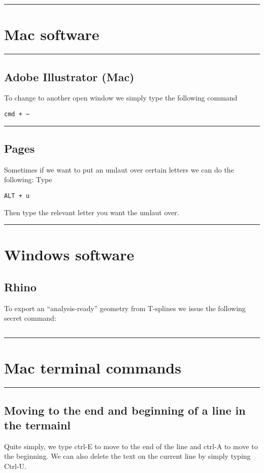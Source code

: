 \documentclass[a4paper, 10pt]{article}
\newcommand{\mytoprule}{\hrule\vspace{4mm}}
\newcommand{\mybotrule}{\vspace{4mm}\hrule}
\begin{document}
\mybotrule

\vspace{10mm}
\section*{Mac software}

\mytoprule
\subsection*{Adobe Illustrator (Mac)}
To change to another open window we simply type the following command
\begin{Verbatim}[commandchars=\\\{\}]
cmd + ~
\end{Verbatim}
\mybotrule

\subsection*{Pages}
Sometimes if we want to put an umlaut over certain letters we can do the following: Type
\begin{verbatim}
ALT + u
\end{verbatim}
Then type the relevant letter you want the umlaut over.

\mybotrule

\vspace{10mm}
\section*{Windows software}

\subsection*{Rhino}
\label{sec:rhino}

To export an ``analysis-ready'' geometry from T-splines we issue the
following secret command:
\begin{verbatim}

\end{verbatim}



\mybotrule
\vspace{10mm}
\section*{Mac terminal commands}

\mytoprule
\subsection*{Moving to the end and beginning of a line in the termainl}
Quite simply, we type ctrl-E to move to the end of the line and ctrl-A to move to the beginning. We can also delete the text on the current line by simply typing Ctrl-U.
\end{document}
